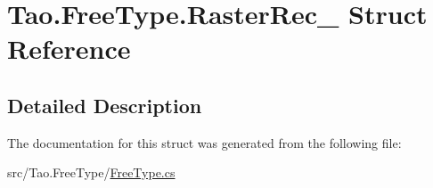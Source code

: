 \hypertarget{struct_tao_1_1_free_type_1_1_raster_rec__}{
\section{Tao.FreeType.RasterRec\_\- Struct Reference}
\label{struct_tao_1_1_free_type_1_1_raster_rec__}
}


\subsection{Detailed Description}


The documentation for this struct was generated from the following file:\begin{DoxyCompactItemize}
\item 
src/Tao.FreeType/\hyperlink{_free_type_8cs}{FreeType.cs}\end{DoxyCompactItemize}
